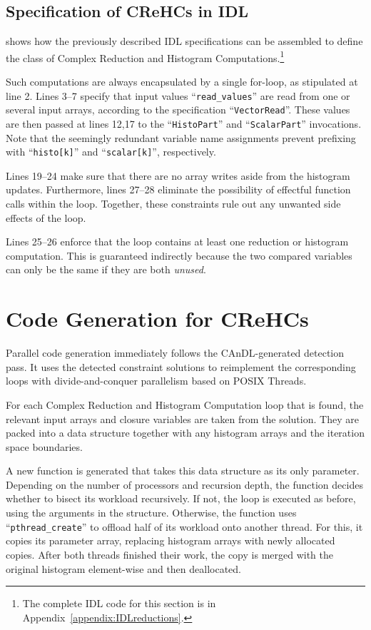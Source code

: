 \subsection{Specification of CReHCs in IDL}
\label{sec:IDLCReHCs}

     shows how the previously described IDL specifications
    can be assembled to define the class of Complex Reduction and Histogram
    Computations.\footnote{The complete IDL code for this section is in
    Appendix~\ref{appendix:IDLreductions}.}

    Such computations are always encapsulated by a single for-loop, as
    stipulated at line 2.
    Lines 3--7 specify that input values ``{\tt read\_values}'' are read from
    one or several input arrays, according to the specification
    ``{\tt VectorRead}''.
    These values are then passed at lines 12,17 to the ``{\tt HistoPart}''
    and ``{\tt ScalarPart}'' invocations.
    Note that the seemingly redundant variable name assignments prevent
    prefixing with ``{\tt histo[k]}'' and ``{\tt scalar[k]}'', respectively.

    Lines 19--24 make sure that there are no array writes aside from the
    histogram updates.
    Furthermore, lines 27--28 eliminate the possibility of effectful function
    calls within the loop.
    Together, these constraints rule out any unwanted side effects of the loop.

    Lines 25--26 enforce that the loop contains at least one reduction or
    histogram computation.
    This is guaranteed indirectly because the two compared variables can only be
    the same if they are both {\it unused}.

\section{Code Generation for CReHCs}

    Parallel code generation immediately follows the CAnDL-generated detection
    pass.
    It uses the detected constraint solutions to reimplement the corresponding
    loops with divide-and-conquer parallelism based on POSIX Threads.

    For each Complex Reduction and Histogram Computation loop that is found, the
    relevant input arrays and closure variables are taken from the solution.
    They are packed into a data structure together with any histogram arrays
    and the iteration space boundaries.

    A new function is generated that takes this data structure as its only
    parameter.
    Depending on the number of processors and recursion depth, the function
    decides whether to bisect its workload recursively.
    If not, the loop is executed as before, using the arguments in the
    structure.
    Otherwise, the function uses ``{\tt pthread\_create}'' to offload half of
    its workload onto another thread.
    For this, it copies its parameter array, replacing histogram arrays with
    newly allocated copies.
    After both threads finished their work, the copy is merged with the original
    histogram element-wise and then deallocated.

